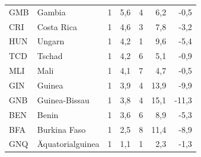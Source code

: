 \documentclass[11pt,a4paper]{article}
\begin{document}
\begin{center}
\begin{tabular}{llrrrrr}
GMB & Gambia & 1 & 5,6 & 4 & 6,2 & -0,5 \\
CRI & Costa Rica & 1 & 4,6 & 3 & 7,8 & -3,2 \\
HUN & Ungarn & 1 & 4,2 & 1 & 9,6 & -5,4 \\
TCD & Tschad & 1 & 4,2 & 6 & 5,1 & -0,9 \\
MLI & Mali & 1 & 4,1 & 7 & 4,7 & -0,5 \\
GIN & Guinea & 1 & 3,9 & 4 & 13,9 & -9,9 \\
GNB & Guinea-Bissau & 1 & 3,8 & 4 & 15,1 & -11,3 \\
BEN & Benin & 1 & 3,6 & 6 & 8,9 & -5,3 \\
BFA & Burkina Faso & 1 & 2,5 & 8 & 11,4 & -8,9 \\
GNQ & \"Aquatorialguinea & 1 & 1,1 & 1 & 2,3 & -1,3 \\
\bottomrule
\end{tabular}
\end{center}
\end{document}
